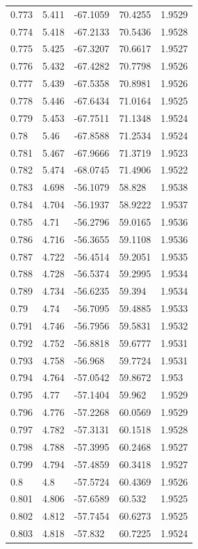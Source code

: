 \begin{tabular}{lllll}
0.773 & 5.411 & -67.1059 & 70.4255 & 1.9529 \\
0.774 & 5.418 & -67.2133 & 70.5436 & 1.9528 \\
0.775 & 5.425 & -67.3207 & 70.6617 & 1.9527 \\
0.776 & 5.432 & -67.4282 & 70.7798 & 1.9526 \\
0.777 & 5.439 & -67.5358 & 70.8981 & 1.9526 \\
0.778 & 5.446 & -67.6434 & 71.0164 & 1.9525 \\
0.779 & 5.453 & -67.7511 & 71.1348 & 1.9524 \\
0.78 & 5.46 & -67.8588 & 71.2534 & 1.9524 \\
0.781 & 5.467 & -67.9666 & 71.3719 & 1.9523 \\
0.782 & 5.474 & -68.0745 & 71.4906 & 1.9522 \\
0.783 & 4.698 & -56.1079 & 58.828 & 1.9538 \\
0.784 & 4.704 & -56.1937 & 58.9222 & 1.9537 \\
0.785 & 4.71 & -56.2796 & 59.0165 & 1.9536 \\
0.786 & 4.716 & -56.3655 & 59.1108 & 1.9536 \\
0.787 & 4.722 & -56.4514 & 59.2051 & 1.9535 \\
0.788 & 4.728 & -56.5374 & 59.2995 & 1.9534 \\
0.789 & 4.734 & -56.6235 & 59.394 & 1.9534 \\
0.79 & 4.74 & -56.7095 & 59.4885 & 1.9533 \\
0.791 & 4.746 & -56.7956 & 59.5831 & 1.9532 \\
0.792 & 4.752 & -56.8818 & 59.6777 & 1.9531 \\
0.793 & 4.758 & -56.968 & 59.7724 & 1.9531 \\
0.794 & 4.764 & -57.0542 & 59.8672 & 1.953 \\
0.795 & 4.77 & -57.1404 & 59.962 & 1.9529 \\
0.796 & 4.776 & -57.2268 & 60.0569 & 1.9529 \\
0.797 & 4.782 & -57.3131 & 60.1518 & 1.9528 \\
0.798 & 4.788 & -57.3995 & 60.2468 & 1.9527 \\
0.799 & 4.794 & -57.4859 & 60.3418 & 1.9527 \\
0.8 & 4.8 & -57.5724 & 60.4369 & 1.9526 \\
0.801 & 4.806 & -57.6589 & 60.532 & 1.9525 \\
0.802 & 4.812 & -57.7454 & 60.6273 & 1.9525 \\
0.803 & 4.818 & -57.832 & 60.7225 & 1.9524 \\

\end{tabular}
